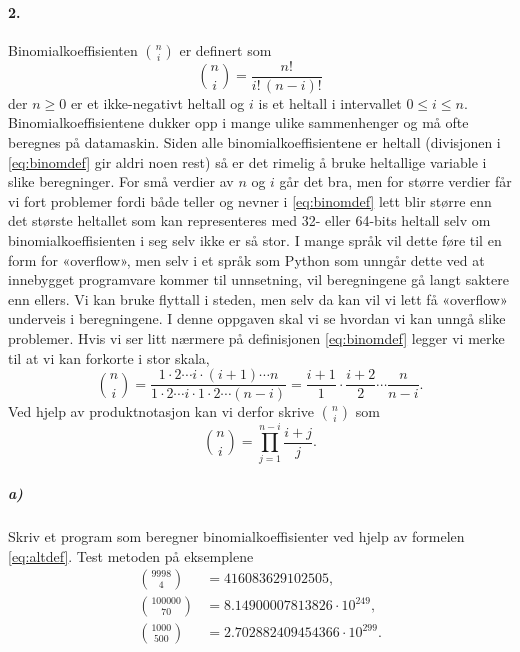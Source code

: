 \documentclass[11pt,norsk]{article}
\begin{document}
		\paragraph{2.}
			\begin{flushleft}
Binomialkoeffisienten $\binom{n}{i}$ er definert som
				\begin{equation}\label{eq:binomdef}
\binom{n}{i}=\frac{n!}{i!\,(n-i)!}
				\end{equation}
der $n\ge 0$ er et ikke-negativt heltall og $i$ is et heltall i intervallet $0\le i \le n$.
Binomialkoeffisientene dukker opp i mange ulike sammenhenger og må ofte beregnes på datamaskin. Siden alle binomialkoeffisientene er heltall (divisjonen i  \eqref{eq:binomdef} gir aldri noen rest) så er det rimelig å bruke heltallige variable i slike beregninger. For små verdier av $n$ og $i$ går det bra, men for større verdier får vi fort problemer fordi både teller og nevner i \eqref{eq:binomdef} lett blir større enn det største heltallet som kan representeres med 32- eller 64-bits heltall selv om binomialkoeffisienten i seg selv ikke er så stor. I mange språk vil dette føre til en form for «overflow», men selv i et språk som Python som unngår dette ved at innebygget programvare kommer til unnsetning, vil beregningene gå langt saktere enn ellers. Vi kan bruke flyttall i steden, men selv da kan vil vi lett få «overflow» underveis i beregningene. I denne oppgaven skal vi se hvordan vi kan unngå slike problemer.
Hvis vi ser litt nærmere på definisjonen \eqref{eq:binomdef} legger vi merke til at vi kan forkorte i stor skala,
$$
\binom{n}{i}=\frac{1\cdot 2 \cdots i \cdot (i+1) \cdots n}
{1\cdot 2 \cdots i \cdot 1 \cdot 2 \cdots (n-i)}
=\frac{i+1}{1}\cdot\frac{i+2}{2}\cdots \frac{n}{n-i}.
$$
Ved hjelp av produktnotasjon kan vi derfor skrive $\binom{n}{i}$ som
				\begin{equation}\label{eq:altdef}
\binom{n}{i}=\prod_{j=1}^{n-i} \frac{i+j}{j}.
				\end{equation}
			\end{flushleft}			
			\subparagraph{a)}
				\begin{flushleft}
Skriv et program som beregner binomialkoeffisienter ved hjelp av formelen \eqref{eq:altdef}. Test metoden på eksemplene
					\begin{align*}
\binom{9998}{4} &= 416083629102505,\\[3pt]
\binom{100000}{70} &= 8.14900007813826 \cdot 10^{249},\\[3pt]
\binom{1000}{500} &=  2.702882409454366 \cdot 10^{299}.
					\end{align*}\nobreak
				\end{flushleft}
\end{document}
